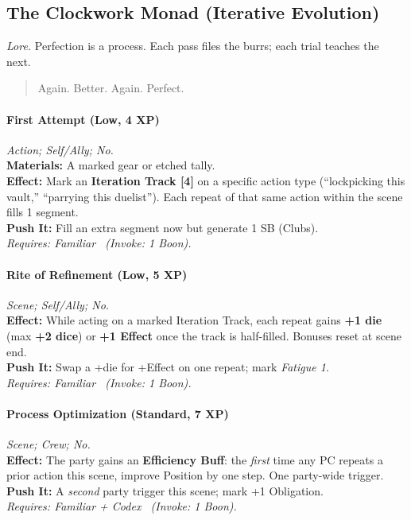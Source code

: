 
\subsection{The Clockwork Monad (Iterative Evolution)}
\textit{Lore.} Perfection is a process. Each pass files the burrs; each trial teaches the next.

\begin{quote}
Again. Better. Again. Perfect.
\end{quote}

\paragraph{First Attempt (Low, 4 XP)} \emph{Action; Self/Ally; No.}\\
\textbf{Materials:} A marked gear or etched tally.\\
\textbf{Effect:} Mark an \textbf{Iteration Track [4]} on a specific action type (``lockpicking this vault,'' ``parrying this duelist''). Each repeat of that same action within the scene fills 1 segment.\\
\textbf{Push It:} Fill an extra segment now but generate 1 SB (Clubs).\\
\emph{Requires: Familiar \ (\textit{Invoke:} 1 Boon).}

\paragraph{Rite of Refinement (Low, 5 XP)} \emph{Scene; Self/Ally; No.}\\
\textbf{Effect:} While acting on a marked Iteration Track, each repeat gains \textbf{+1 die} (max \textbf{+2 dice}) or \textbf{+1 Effect} once the track is half-filled. Bonuses reset at scene end.\\
\textbf{Push It:} Swap a +die for +Effect on one repeat; mark \emph{Fatigue 1}.\\
\emph{Requires: Familiar \ (\textit{Invoke:} 1 Boon).}

\paragraph{Process Optimization (Standard, 7 XP)} \emph{Scene; Crew; No.}\\
\textbf{Effect:} The party gains an \textbf{Efficiency Buff}: the \emph{first} time any PC repeats a prior action this scene, improve Position by one step. One party-wide trigger.\\
\textbf{Push It:} A \emph{second} party trigger this scene; mark +1 Obligation.\\
\emph{Requires: Familiar + Codex \ (\textit{Invoke:} 1 Boon).}

